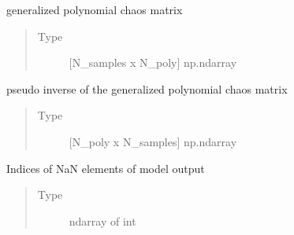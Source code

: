 \documentclass[letterpaper,10pt,english,openany,oneside]{sphinxmanual}
\begin{document}
\begin{fulllineitems}
\begin{fulllineitems}
\begin{quote}
\begin{description}
\end{description}\end{quote}

\end{fulllineitems}


\begin{fulllineitems}
\label{\detokenize{pygpc:pygpc.GPC.GPC.gpc_matrix}}
generalized polynomial chaos matrix
\begin{quote}\begin{description}
\item[{Type}] \leavevmode
{[}N\_samples x N\_poly{]} np.ndarray

\end{description}\end{quote}

\end{fulllineitems}


\begin{fulllineitems}
\label{\detokenize{pygpc:pygpc.GPC.GPC.gpc_matrix_inv}}
pseudo inverse of the generalized polynomial chaos matrix
\begin{quote}\begin{description}
\item[{Type}] \leavevmode
{[}N\_poly x N\_samples{]} np.ndarray

\end{description}\end{quote}

\end{fulllineitems}


\begin{fulllineitems}
\label{\detokenize{pygpc:pygpc.GPC.GPC.nan_elm}}
Indices of NaN elements of model output
\begin{quote}\begin{description}
\item[{Type}] \leavevmode
ndarray of int


\end{description}
\end{quote}
\end{fulllineitems}
\end{fulllineitems}
\end{document}
